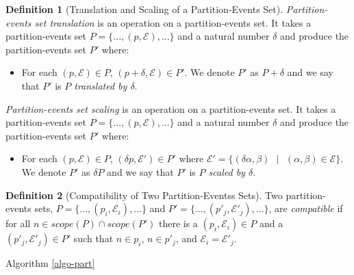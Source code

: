 \documentclass[]{elsarticle}
\theoremstyle{definition}
\newtheorem{definition2}{Definition}
\theoremstyle{definition}
\newcommand{\ee}{\mathcal{E}}
\newcommand{\se}{\text{ }}
\begin{document}

\begin{definition2}[Translation and Scaling of a Partition-Events Set]
\emph{Partition-events set translation} is an operation on a partition-events set. It takes a 
partition-events set $P=\{...,(p,\ee),...\}$ and a natural number $\delta$ and produce the 
partition-events set $P'$ where:
\begin{itemize}
   \item For each $(p,\ee)\in P$, $(p+\delta,\ee) \in P'$. We denote $P'$ as $P+\delta$ and we say 
         that $P'$ is \emph{$P$ translated by $\delta$}.
\end{itemize}
\emph{Partition-events set scaling} is an operation on a partition-events set. It takes a 
partition-events set $P=\{...,(p,\ee),...\}$ and a natural number $\delta$ and produce the 
partition-events set $P'$ where:
\begin{itemize}
   \item For each $(p,\ee)\in P$, $(\delta p,\ee') \in P'$ where $\ee'=\{(\delta\alpha,\beta)\se|\se
         (\alpha,\beta)\in \ee\}$. We denote $P'$ as $\delta P$ and we say that $P'$ is \emph{$P$ 
         scaled by $\delta$}.
\end{itemize}
\end{definition2}


\begin{definition2}[Compatibility of Two Partition-Eventss Sets] Two partition-events sets, 
$P=\{...,(p_i,\ee_i),...\}$ and $P'=\{...,(p'_j,\ee'_j),...\}$, are \emph{compatible} if for all 
$n \in scope(P) \cap scope(P')$ there is a $(p_i, \ee_i)\in P$ and a $(p'_j,\ee'_j) \in P'$ such 
that  $n \in p_i$, $n\in p'_j$, and $\ee_i=\ee'_j$.
\end{definition2}


Algorithm \ref{algo-part}
\end{document}

